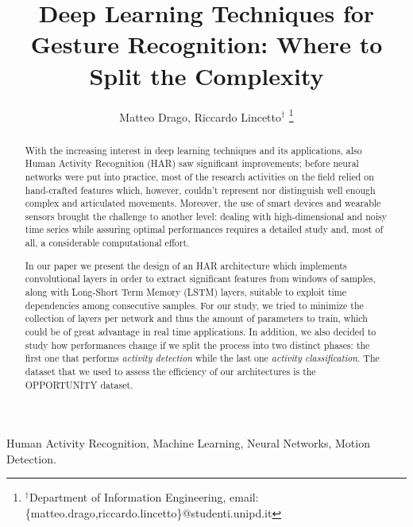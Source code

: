 \documentclass[10pt, conference, journal]{IEEEtran}
\title{Deep Learning Techniques for Gesture Recognition: Where to Split the Complexity}
\author{Matteo Drago, Riccardo Lincetto$^\dag$
\thanks{$^\dag$Department of Information Engineering, email: \{matteo.drago,riccardo.lincetto\}@studenti.unipd.it}
}
\begin{document}
\maketitle

\begin{abstract}
	
With the increasing interest in deep learning techniques and its applications, also Human Activity Recognition (HAR) saw significant improvements; before neural networks were put into practice, most of the research activities on the field relied on hand-crafted features which, however, couldn't represent nor distinguish well enough complex and articulated movements. Moreover, the use of smart devices and wearable sensors brought the challenge to another level: dealing with high-dimensional and noisy time series while assuring optimal performances requires a detailed study and, most of all, a considerable computational effort.

In our paper we present the design of an HAR architecture which implements convolutional layers in order to extract significant features from windows of samples, along with Long-Short Term Memory (LSTM) layers, suitable to exploit time dependencies among consecutive samples. For our study, we tried to minimize the collection of layers per network and thus the amount of parameters to train, which could be of great advantage in real time applications. In addition, we also decided to study how performances change if we split the process into two distinct phases: the first one that performs \textit{activity detection} while the last one \textit{activity classification}. The dataset that we used to assess the efficiency of our architectures is the OPPORTUNITY dataset.

\end{abstract}

\IEEEkeywords
Human Activity Recognition, Machine Learning, Neural Networks, Motion Detection. 
\endIEEEkeywords












%
%
\end{document}
